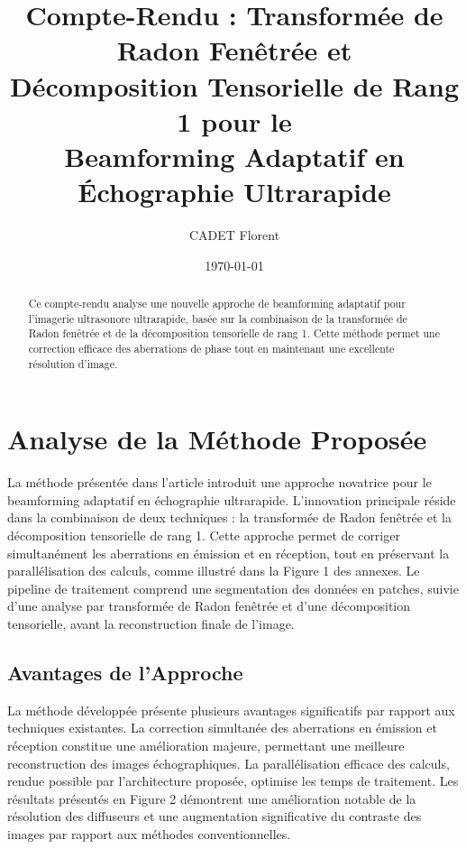 \documentclass[12pt,a4paper]{article}
\title{Compte-Rendu : Transformée de Radon Fenêtrée et\\Décomposition Tensorielle de Rang 1 pour le\\Beamforming Adaptatif en Échographie Ultrarapide}
\author{CADET Florent}
\date{\today}
\begin{document}
\maketitle

\begin{abstract}
Ce compte-rendu analyse une nouvelle approche de beamforming adaptatif pour l'imagerie ultrasonore ultrarapide, basée sur la combinaison de la transformée de Radon fenêtrée et de la décomposition tensorielle de rang 1. Cette méthode permet une correction efficace des aberrations de phase tout en maintenant une excellente résolution d'image.
\end{abstract}

\clearpage
{}
\tableofcontents

\clearpage
\section{Analyse de la Méthode Proposée}

La méthode présentée dans l'article introduit une approche novatrice pour le beamforming adaptatif en échographie ultrarapide. L'innovation principale réside dans la combinaison de deux techniques : la transformée de Radon fenêtrée et la décomposition tensorielle de rang 1. Cette approche permet de corriger simultanément les aberrations en émission et en réception, tout en préservant la parallélisation des calculs, comme illustré dans la Figure 1 des annexes. Le pipeline de traitement comprend une segmentation des données en patches, suivie d'une analyse par transformée de Radon fenêtrée et d'une décomposition tensorielle, avant la reconstruction finale de l'image.

\subsection{Avantages de l'Approche}
La méthode développée présente plusieurs avantages significatifs par rapport aux techniques existantes. La correction simultanée des aberrations en émission et réception constitue une amélioration majeure, permettant une meilleure reconstruction des images échographiques. La parallélisation efficace des calculs, rendue possible par l'architecture proposée, optimise les temps de traitement. Les résultats présentés en Figure 2 démontrent une amélioration notable de la résolution des diffuseurs et une augmentation significative du contraste des images par rapport aux méthodes conventionnelles.
\end{document}

